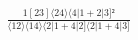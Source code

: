 \documentclass[varwidth, border=5pt]{standalone}
\begin{document}
\begin{my}
$\begin{gathered}
\scriptscriptstyle\frac{1[23]⟨24⟩⟨4|1+2|3]²}{⟨12⟩⟨14⟩⟨2|1+4|2]⟨2|1+4|3]}
\end{gathered}$
\end{my}
\end{document}
